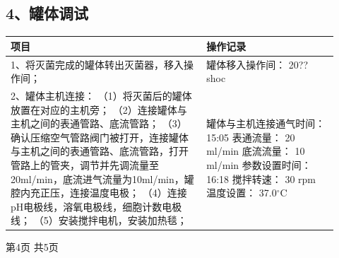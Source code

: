 \documentclass[UTF8,10pt,a4paper,fontset=fandol]{ctexart}
\newcommand{\fieldvalue}[1]{#1}
\newcommand{\handwritten}[1]{#1}
\begin{document}
\subsection*{4、罐体调试}

\begin{tabular}{|p{0.55\linewidth}|p{0.37\linewidth}|}
\hline
\centering 项目 & \centering 操作记录\\ \hline
1、将灭菌完成的罐体转出灭菌器，移入操作间；
&
罐体移入操作间：
\fieldvalue{\handwritten{20??}} shoc
\\ \hline
2、罐体主机连接：\newline
（1）将灭菌后的罐体放置在对应的主机旁；\newline
（2）连接罐体与主机之间的表通管路、底流管路；\newline
（3）确认压缩空气管路阀门被打开，连接罐体与主机之间的表通管路、底流管路，打开管路上的管夹，调节并先调流量至20ml/min，底流进气流量为10ml/min，罐腔内充正压，连接温度电极；\newline
（4）连接pH电极线，溶氧电极线，细胞计数电极线；\newline
（5）安装搅拌电机，安装加热毯；
&
罐体与主机连接通气时间：
\fieldvalue{\handwritten{15:05}}\newline
表通流量：
\fieldvalue{\handwritten{20}} ml/min\newline
底流流量：
\fieldvalue{\handwritten{10}} ml/min\newline
参数设置时间：
\fieldvalue{\handwritten{16:18}}\newline
搅拌转速：
\fieldvalue{\handwritten{30}} rpm\newline
温度设置：
\fieldvalue{\handwritten{37.0}}$^\circ$C
\\ \hline
\end{tabular}

\medskip

\begin{center}
第4页 共5页
\end{center}
\end{document}
